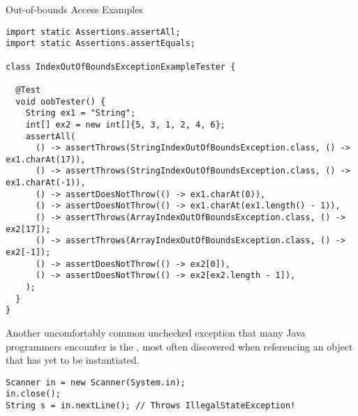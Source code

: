 \begin{cl}{Out-of-bounds Access Examples}
\begin{lstlisting}[language=MyJava]
import static Assertions.assertAll;
import static Assertions.assertEquals;

class IndexOutOfBoundsExceptionExampleTester {

  @Test
  void oobTester() {
    String ex1 = "String";
    int[] ex2 = new int[]{5, 3, 1, 2, 4, 6}; 
    assertAll(
      () -> assertThrows(StringIndexOutOfBoundsException.class, () -> ex1.charAt(17)),
      () -> assertThrows(StringIndexOutOfBoundsException.class, () -> ex1.charAt(-1)),
      () -> assertDoesNotThrow(() -> ex1.charAt(0)),
      () -> assertDoesNotThrow(() -> ex1.charAt(ex1.length() - 1)),
      () -> assertThrows(ArrayIndexOutOfBoundsException.class, () -> ex2[17]);
      () -> assertThrows(ArrayIndexOutOfBoundsException.class, () -> ex2[-1]);
      () -> assertDoesNotThrow(() -> ex2[0]),
      () -> assertDoesNotThrow(() -> ex2[ex2.length - 1]),
    );
  } 
}
\end{lstlisting}
\end{cl} 

Another uncomfortably common unchecked exception that many Java programmers encounter is the , most often discovered when referencing an object that has yet to be instantiated. 


\par{
\begin{verbatim}
Scanner in = new Scanner(System.in);
in.close();
String s = in.nextLine(); // Throws IllegalStateException!
\end{verbatim}
}
